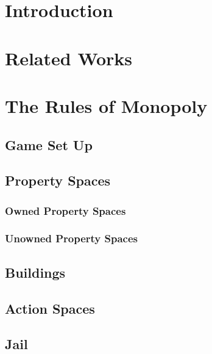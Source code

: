 \documentclass[12pt]{article}
\begin{document}


\tableofcontents
\newpage


\section{Introduction}\label{sec:intro}

 
%
\section{Related Works}\label{sec:background}

%
\section{The Rules of Monopoly}\label{sec:RulesofMonopoly}

\subsection{Game Set Up}

\subsection{Property Spaces}

\subsubsection{Owned Property Spaces}

\subsubsection{Unowned Property Spaces}

\subsection{Buildings}

\subsection{Action Spaces}

\subsection{Jail}

\end{document}

